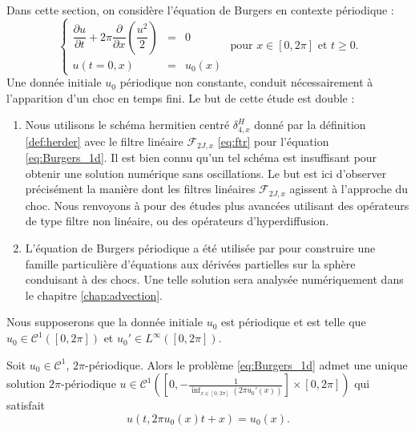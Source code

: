 Dans cette section, on considère l'équation de Burgers en contexte périodique \cite{Burgers1948, Witham1974} :
\begin{equation}
\left\lbrace
\begin{array}{rcl}
\dfrac{\partial u}{\partial t} + 2 \pi \dfrac{\partial}{\partial x} \left( \dfrac{u^2}{2} \right) & = & 0 \\
u(t=0,x) & = & u_0(x)
\end{array}
\right. \text{ pour } x \in [0, 2\pi] \text{ et } t \geq 0.
\label{eq:Burgers_1d}
\end{equation}
Une donnée initiale $u_0$ périodique non constante, conduit nécessairement à l'apparition d'un choc en temps fini. Le but de cette étude est double :
\begin{enumerate}
\item Nous utilisons le schéma hermitien centré $\delta_{4,x}^H$ donné par la définition \ref{def:herder}  avec le filtre linéaire $\mathcal{F}_{2J,x}$ \eqref{eq:ftr} pour l'équation \eqref{eq:Burgers_1d}. Il est bien connu qu'un tel schéma est insuffisant pour obtenir une solution numérique sans oscillations. Le but est ici d'observer précisément la manière dont les filtres linéaires $\mathcal{F}_{2J,x}$ agissent à l'approche du choc. Nous renvoyons à \cite{Cook2005,Yee1989} pour des études plus avancées utilisant des opérateurs de type filtre non linéaire, ou des opérateurs d'hyperdiffusion.

\item L'équation de Burgers périodique a été utilisée par \cite{BenArtzi2009} pour construire une famille particulière d'équations aux dérivées partielles sur la sphère conduisant à des chocs. Une telle solution sera analysée numériquement dans le chapitre \ref{chap:advection}.
\end{enumerate}

Nous supposerons que la donnée initiale $u_0$ est périodique et est telle que $u_0 \in \mathcal{C}^1([0,2 \pi])$ et $u_0' \in L^{\infty}([0,2 \pi])$.

\begin{theoreme}
Soit $u_0 \in \mathcal{C}^1$, $2 \pi$-périodique. Alors le problème \eqref{eq:Burgers_1d} admet une unique solution $2 \pi$-périodique $u \in \mathcal{C}^1\left(\left[0, -\frac{1}{\inf_{x \in [0,2\pi]} (2 \pi u_0'(x))}\right] \times [0, 2 \pi]\right)$ qui satisfait
\begin{equation}
u(t,2 \pi u_0(x)t + x)=u_0(x).
\end{equation}
\end{theoreme}

